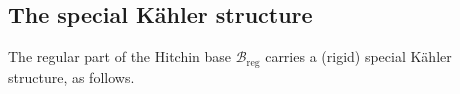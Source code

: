 \documentclass[12pt,letterpaper,reqno]{article}
\numberwithin{equation}{section}
\newcommand{\cB}{\ensuremath{\mathcal B}}
\newcommand{\cM}{\ensuremath{\mathcal M}}
\newcommand{\kahler}{K\"ahler\xspace}
\newcommand{\hk}{hyperk\"ahler\xspace}
\newcommand{\reg}{\mathrm{reg}}
\DeclareMathOperator{\Tr}{Tr}
\newcommand{\fixme}[1]{{\color{orange}{[#1]}}}
\begin{document}








\subsection{The special \kahler structure}

The regular part of the Hitchin base $\cB_\reg$ 
carries a (rigid) special \kahler structure, as follows.
\end{document}
